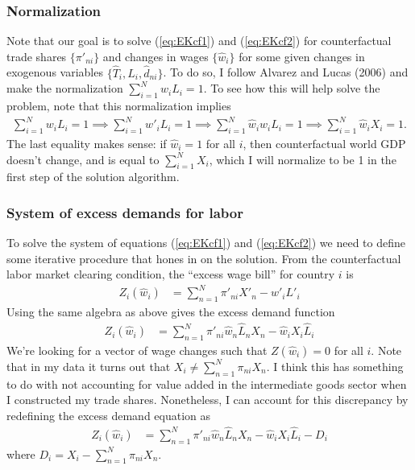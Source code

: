 \documentclass[12pt]{article}
\begin{document}
\subsubsection{Normalization}
Note that our goal is to solve (\ref{eq:EKcf1}) and (\ref{eq:EKcf2}) for counterfactual trade shares $\{\pi'_{ni}\}$ and changes in wages $\{\hat w_i\}$ for some given changes in exogenous variables $\{\hat T_i, \hat L_i, \hat d_{ni}\}$.
To do so, I follow Alvarez and Lucas (2006) and make the normalization $\sum_{i=1}^N w_iL_i = 1$. To see how this will help solve the problem, note that this normalization implies
\begin{align*}
\sum_{i=1}^N w_iL_i = 1 \implies \sum_{i=1}^N w'_iL_i = 1 \implies \sum_{i=1}^N \hat w_i w_i L_i = 1 \implies \sum_{i=1}^N \hat w_i X_i = 1.
\end{align*}
The last equality makes sense: if $\hat w_i =1$ for all $i$, then counterfactual world GDP doesn't change, and is equal to $ \sum_{i=1}^N X_i$, which I will normalize to be 1 in the first step of the solution algorithm.

\subsubsection{System of excess demands for labor}
To solve the system of equations (\ref{eq:EKcf1}) and (\ref{eq:EKcf2}) we need to define some iterative procedure that hones in on the solution. From the counterfactual labor market clearing condition, the ``excess wage bill'' for country $i$ is 
\begin{align*}
Z_i(\hat w_i) &= \sum_{n=1}^N \pi'_{ni}X'_n - w'_i L'_i
\end{align*}
Using the same algebra as above gives the excess demand function
\begin{align*}
Z_i(\hat w_i) &= \sum_{n=1}^N \pi'_{ni} \hat w_n \hat L_n X_n - \hat w_i X_i\hat L_i  
\end{align*}
We're looking for a vector of wage changes such that $Z(\hat w_i) = 0$ for all $i$. Note that in my data it turns out that $X_i \neq \sum_{n=1}^N \pi_{ni}X_{n}$. I think this has something to do with not accounting for value added in the intermediate goods sector when I constructed my trade shares. Nonetheless, I can account for this discrepancy by redefining the excess demand equation as
\begin{align}
Z_i(\hat w_i) &= \sum_{n=1}^N \pi'_{ni} \hat w_n \hat L_n X_n - \hat w_i X_i\hat L_i - D_i \label{eq:EKcf3}
\end{align}
where $D_i = X_i  - \sum_{n=1}^N \pi_{ni}X_{n}$.
\end{document}
